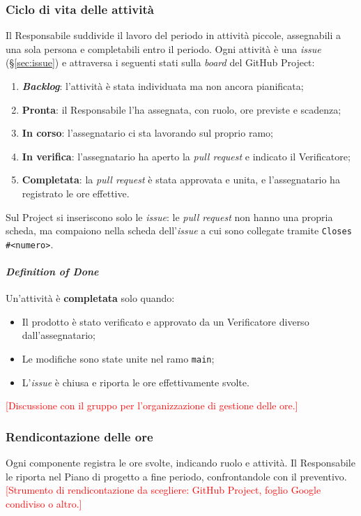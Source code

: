 \documentclass[12pt,a4paper]{article}
\newcommand{\ph}[1]{\textcolor{red}{[#1]}}
\newcommand{\tightlist}{\setlength{\itemsep}{1pt}\setlength{\parskip}{0pt}}
\begin{document}
\subsubsection{Ciclo di vita delle attività}\label{sec:attivita}
Il Responsabile suddivide il lavoro del periodo in attività piccole, assegnabili a una sola persona e completabili entro il periodo. Ogni attività è una \emph{issue} (§\ref{sec:issue}) e attraversa i seguenti stati sulla \emph{board} del GitHub Project:
\begin{enumerate}
\tightlist
\item \textbf{\emph{Backlog}}: l'attività è stata individuata ma non ancora pianificata;
\item \textbf{Pronta}: il Responsabile l'ha assegnata, con ruolo, ore previste e scadenza;
\item \textbf{In corso}: l'assegnatario ci sta lavorando sul proprio ramo;
\item \textbf{In verifica}: l'assegnatario ha aperto la \emph{pull request} e indicato il Verificatore;
\item \textbf{Completata}: la \emph{pull request} è stata approvata e unita, e l'assegnatario ha registrato le ore effettive.
\end{enumerate}
Sul Project si inseriscono solo le \emph{issue}: le \emph{pull request} non hanno una propria scheda, ma compaiono nella scheda dell'\emph{issue} a cui sono collegate tramite \texttt{Closes \#<numero>}.

\paragraph{\emph{Definition of Done}}
Un'attività è \textbf{completata} solo quando:
\begin{itemize}
\tightlist
\item Il prodotto è stato verificato e approvato da un Verificatore diverso dall'assegnatario;
\item Le modifiche sono state unite nel ramo \texttt{main};
\item L'\emph{issue} è chiusa e riporta le ore effettivamente svolte.
\end{itemize}
\ph{Discussione con il gruppo per l'organizzazione di gestione delle ore.}

\subsubsection{Rendicontazione delle ore}
Ogni componente registra le ore svolte, indicando ruolo e attività. Il Responsabile le riporta nel Piano di progetto a fine periodo, confrontandole con il preventivo. \ph{Strumento di rendicontazione da scegliere: GitHub Project, foglio Google condiviso o altro.}
\end{document}

